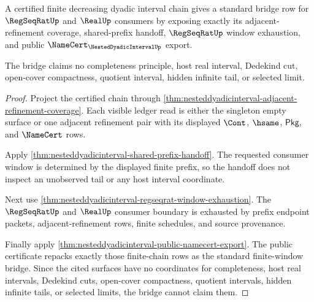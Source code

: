 \begin{theorem}
\label{thm:nesteddyadicinterval-standard-bridge-window}
A certified finite decreasing dyadic interval chain gives a standard bridge row
for $\RegSeqRatUp$ and $\RealUp$ consumers by exposing exactly its
adjacent-refinement coverage, shared-prefix handoff, $\RegSeqRatUp$ window
exhaustion, and public $\NameCert_{\NestedDyadicIntervalUp}$ export.

The bridge claims no completeness principle, host real interval, Dedekind cut,
open-cover compactness, quotient interval, hidden infinite tail, or selected
limit.
\end{theorem}
\begin{proof}
Project the certified chain through
\autoref{thm:nesteddyadicinterval-adjacent-refinement-coverage}. Each visible
ledger read is either the singleton empty surface or one adjacent refinement
pair with its displayed $\Cont$, $\hsame$, $\mathsf{Pkg}$, and $\NameCert$ rows.

Apply \autoref{thm:nesteddyadicinterval-shared-prefix-handoff}. The requested
consumer window is determined by the displayed finite prefix, so the handoff
does not inspect an unobserved tail or any host interval coordinate.

Next use \autoref{thm:nesteddyadicinterval-regseqrat-window-exhaustion}. The
$\RegSeqRatUp$ and $\RealUp$ consumer boundary is exhausted by prefix endpoint
packets, adjacent-refinement rows, finite schedules, and source provenance.

Finally apply
\autoref{thm:nesteddyadicinterval-public-namecert-export}. The public
certificate repacks exactly those finite-chain rows as the standard
finite-window bridge. Since the cited surfaces have no coordinates for
completeness, host real intervals, Dedekind cuts, open-cover compactness,
quotient intervals, hidden infinite tails, or selected limits, the bridge
cannot claim them.
\end{proof}

